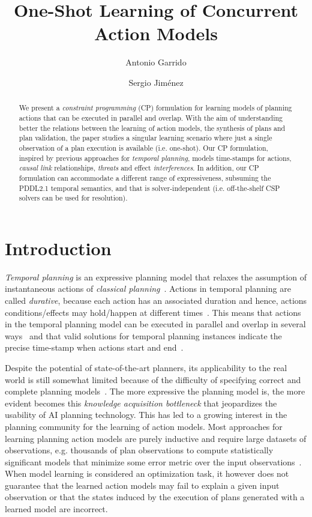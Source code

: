 \documentclass{ecai}
\begin{document}
\title{One-Shot Learning of Concurrent Action Models}
\author{Antonio Garrido \and Sergio Jim\'enez}
 
\maketitle

\begin{abstract}
  We present a {\em constraint programming} (CP) formulation for learning models of planning actions that can be executed in parallel and overlap. With the aim of understanding better the relations between the learning of action models, the synthesis of plans and plan validation, the paper studies a singular learning scenario where just a single observation of a plan execution is available (i.e. one-shot). Our CP formulation, inspired by previous approaches for {\em temporal planning},  models time-stamps for actions, {\em causal link} relationships, {\em threats} and effect {\em interferences}. In addition, our CP formulation can accommodate a different range of expressiveness, subsuming the PDDL2.1 temporal semantics, and that is solver-independent (i.e. off-the-shelf CSP solvers can be used for resolution).   
\end{abstract}


\section{Introduction}
{\em Temporal planning} is an expressive planning model that relaxes the assumption of instantaneous actions of {\em classical planning}~\cite{geffner2013concise}. Actions in temporal planning are called {\em durative}, because each action has an associated duration and hence, actions conditions/effects may hold/happen at different times~\cite{fox2003pddl2}. This means that actions in the temporal planning model can be executed in parallel and overlap in several ways~\cite{cushing2007temporal} and that valid solutions for temporal planning instances indicate the precise time-stamp when actions start and end~\cite{howey2004val}.

Despite the potential of state-of-the-art planners, its applicability to the real world is still somewhat limited because of the difficulty of specifying correct and complete planning models~\cite{kambhampati2007model}. The more expressive the planning model is, the more evident becomes this {\em knowledge acquisition bottleneck} that jeopardizes the usability of AI planning technology. This has led to a growing interest in the planning community for the learning of action models. Most approaches for learning planning action models are purely inductive and require large datasets of observations, e.g. thousands of plan observations to compute statistically significant models that minimize some error metric over the input observations~\cite{yang2007learning,MouraoZPS12,zhuo2013action,kuvcera2018louga}. When model learning is considered an optimization task, it however does not guarantee that the learned action models may fail to explain a given input observation or that the states induced by the execution of plans generated with a learned model are incorrect.
\end{document}
